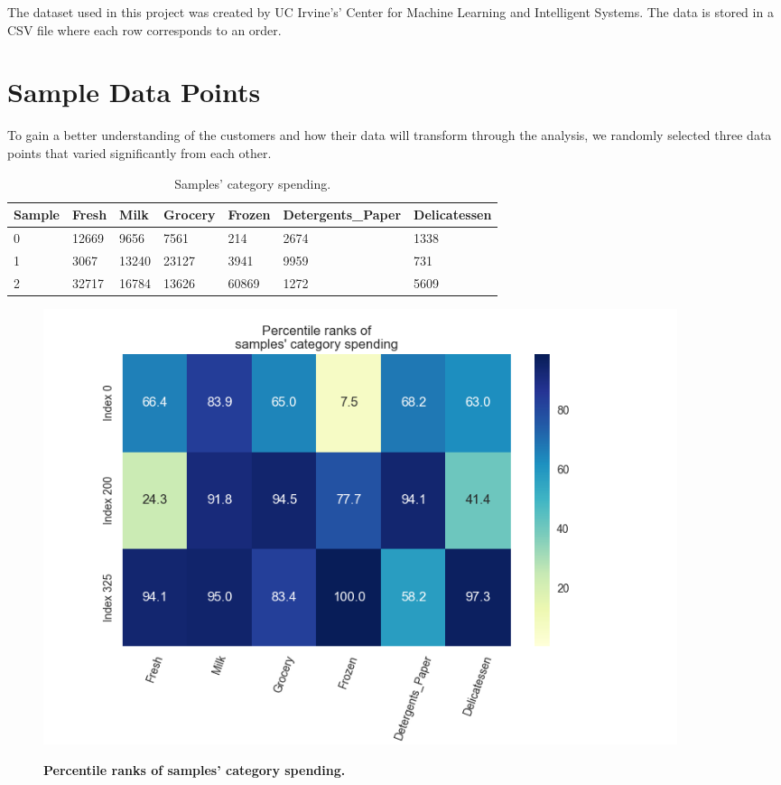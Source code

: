 \documentclass[twoside,openright,titlepage,numbers=noenddot,headinclude,%
               footinclude=true,cleardoublepage=empty,abstractoff,BCOR=5mm,%
               paper=a4,fontsize=11pt,ngerman,american]{scrreprt}
\numberwithin{theorem}{chapter}
\numberwithin{definition}{chapter}
\numberwithin{algorithm}{chapter}
\numberwithin{figure}{chapter}
\numberwithin{table}{chapter}
\numberwithin{equation}{chapter}
\begin{document}
The dataset used in this project was created by UC Irvine's' Center for Machine Learning and Intelligent Systems. The data is stored in a CSV file where each row corresponds to an order.

\section*{Sample Data Points}
To gain a better understanding of the customers and how their data will transform through the analysis, we randomly selected three data points that varied significantly from each other. 

\begin{table}[!htbp]
  \begin{center}
  \caption{Samples' category spending.}
    \begin{tabular}{ |l|l|l|l|l|l|l| } 
    \hline
    Sample & Fresh & Milk & Grocery & Frozen & Detergents\_Paper & Delicatessen\\[1ex]

    \hline
    
      0 &12669 &9656  &7561  &214   &2674  &1338 \\
      1 &3067  &13240 &23127 &3941  &9959  &731  \\
      2 &32717 &16784 &13626 &60869 &1272  &5609 \\
    \hline
    \end{tabular}
    \label{tableSamplesCategorySpending}
  \end{center}
\end{table}

\begin{figure}[!hbtp]
\centering
    \includegraphics[width=0.9\textwidth]{figures/percentileRanksSampleSpending}
    \label{percentileRanksSampleSpending}
    
    \caption{\textbf{Percentile ranks of samples' category spending. }}
\end{figure}
\end{document}
